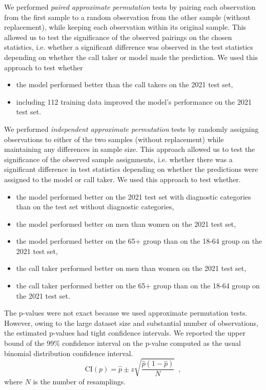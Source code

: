 {We performed \emph{paired approximate permutation} tests by pairing each observation from the first sample to a random observation from the other sample (without replacement), while keeping each observation within its original sample. This allowed us to test the significance of the observed pairings on the chosen statistics, i.e. whether a significant difference was observed in the test statistics depending on whether the call taker or model made the prediction. We used this approach to test whether
%
\begin{itemize}
    \item the model performed better than the call takers on the 2021 test set,
    \item including 112 training data improved the model's performance on the 2021 test set.
\end{itemize}
%
We performed \emph{independent approximate permutation} tests by randomly assigning observations to either of the two samples (without replacement) while maintaining any differences in sample size. This approach allowed us to test the significance of the observed sample assignments, i.e. whether there was a significant difference in test statistics depending on whether the predictions were assigned to the model or call taker. We used this approach to test whether.
%
\begin{itemize}
    \item the model performed better on the 2021 test set with diagnostic categories than on the test set without diagnostic categories,
    \item the model performed better on men than women on the 2021 test set,
    \item the model performed better on the 65+ group than on the 18-64 group on the 2021 test set,
    \item the call taker performed better on men than women on the 2021 test set,
    \item the call taker performed better on the 65+ group than on the 18-64 group on the 2021 test set.
\end{itemize}
%
The p-values were not exact because we used approximate permutation tests. However, owing to the large dataset size and substantial number of observations, the estimated p-values had tight confidence intervals. We reported the upper bound of the 99\% confidence interval on the p-value computed as the usual binomial distribution confidence interval.
%
\begin{equation}
    \text{CI}(p) = \hat{p} \pm z \sqrt{\frac{\hat{p}(1-\hat{p})}{N}} \enspace ,
\end{equation}
%
where $N$ is the number of resamplings.

}
